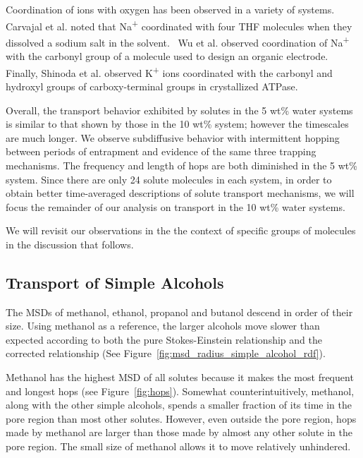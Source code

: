 \documentclass[journal=jpcbfk,manuscript=article]{achemso}
\begin{document}
  Coordination of ions with oxygen has been observed in a variety of systems. 
  Carvajal et al. noted that Na\textsuperscript{+} coordinated with four 
  THF molecules when they dissolved a sodium salt in the solvent.~\cite{carvajal_studies_1965}
  Wu et al. observed coordination of Na\textsuperscript{+} with the carbonyl
  group of a molecule used to design an organic electrode.~\cite{wu_unraveling_2015} 
  Finally, Shinoda et al. observed K\textsuperscript{+} ions coordinated with
  the carbonyl and hydroxyl groups of carboxy-terminal groups in crystallized
  ATPase.~\cite{shinoda_crystal_2009}
  
  Overall, the transport behavior exhibited by solutes in the 5 wt\% water
  systems is similar to that shown by those in the 10 wt\% system; however
  the timescales are much longer. We observe subdiffusive behavior with 
  intermittent hopping between periods of entrapment and evidence
  of the same three trapping mechanisms. The frequency and 
  length of hops are both diminished in the 5 wt\% system. Since there are
  only 24 solute molecules in each system, in order to obtain better 
  time-averaged descriptions of solute transport mechanisms, we will focus
  the remainder of our analysis on transport in the 10 wt\% water systems.
  
  We will revisit our observations in the the context of specific groups of 
  molecules in the discussion that follows.
  
  \subsection{Transport of Simple Alcohols}

  The MSDs of methanol, ethanol, propanol and butanol descend in order of 
  their size. Using methanol as a reference, the larger alcohols move slower
  than expected according to both the pure Stokes-Einstein relationship 
  and the corrected relationship (See Figure~\ref{fig:msd_radius_simple_alcohol_rdf}).
  
  Methanol has the highest MSD of all solutes because it makes the most frequent
  and longest hops (see Figure~\ref{fig:hops}). Somewhat counterintuitively, 
  methanol, along with the other simple alcohols, spends a smaller fraction of its
  time in the pore region than most other solutes. However, even outside the pore
  region, hops made by methanol are larger than those made by almost any other solute
  in the pore region. The small size of methanol allows it to move relatively unhindered. 
\end{document}
